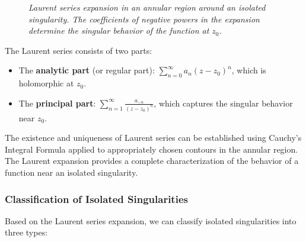 \begin{figure}[H]
\centering
{}
\caption{\textit{Laurent series expansion in an annular region around an isolated singularity. The coefficients of negative powers in the expansion determine the singular behavior of the function at $z_0$.}}
\label{fig:laurent-series}
\end{figure}

\noindent The Laurent series consists of two parts:
\begin{itemize}
    \item The \textbf{analytic part} (or regular part): $\sum_{n=0}^{\infty} a_n (z - z_0)^n$, which is holomorphic at $z_0$.
    \item The \textbf{principal part}: $\sum_{n=1}^{\infty} \frac{a_{-n}}{(z - z_0)^n}$, which captures the singular behavior near $z_0$.
\end{itemize}

\noindent The existence and uniqueness of Laurent series can be established using Cauchy's Integral Formula applied to appropriately chosen contours in the annular region. The Laurent expansion provides a complete characterization of the behavior of a function near an isolated singularity.

\subsubsection*{Classification of Isolated Singularities} 

\noindent Based on the Laurent series expansion, we can classify isolated singularities into three types:

